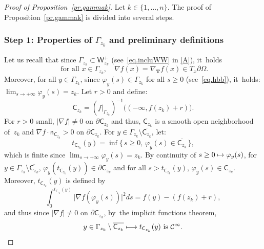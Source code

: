\documentclass[10pt]{amsart}
\newcommand\mto{\mathchoice{\longmapsto}{\mapsto}{\mapsto}{\mapsto}}
\newcommand{\mbf}[1]{\mathbf{#1}}
\let\pa\partial
\theoremstyle{plain}
\theoremstyle{definition}
\begin{document}
\label{sec:gammak}

\begin{proof}[Proof of Proposition~\ref{pr.gammak}]
Let $k\in \{1,\ldots,n\}$.
The proof of Proposition~\ref{pr.gammak} is divided into several steps.

\subsubsection*{Step 1: Properties of $\Gamma_{z_k}$ and preliminary definitions}
Let us recall that since $\Gamma_{z_k}\subset \mathsf W_{z_k}^+$ (see~\eqref{eq.incluWW} in \ref{A}), it~holds
\[
\text{ for all } x\in \Gamma_{z_k}, \quad \nabla f(x)=\nabla_{\mbf T}f(x) \in T_x\partial \Omega.
\]
Moreover, for all $y\in \Gamma_{z_k}$, since $\varphi_y(s)\in \Gamma_{z_k}$ for all $s\ge 0$ (see~\eqref{eq.hbb}), it~holds: $\lim_{s\to +\infty}\varphi_y(s)=z_k$.
Let $r>0$ and define:
\[
\mathsf C_{z_k} =(f|_{\Gamma_{z_k}})^{-1}\bigl((-\infty, f(z_k)+r)\bigr).
\]
For $r>0$ small, $\vert \nabla f\vert \neq 0$ on $\pa \mathsf C_{z_k}$ and thus, ${\mathsf C_{z_k}}$ is a smooth open neighborhood of~$z_k$ and $\nabla f \cdot \mathsf n_{\mathsf C_{z_k}}>0$ on $\pa \mathsf C_{z_k}$. For $y\in \Gamma_{z_k}\setminus \overline{ \mathsf C_{z_k} }$, let:
\begin{equation}\label{eq.sinf}
t_{\mathsf C_{z_k}}(y)=\inf\{\, s\ge 0, \, \varphi_{y}(s)\in \overline{\mathsf C_{z_k}}\, \},
\end{equation}
which is finite since $\lim_{s\to +\infty}\varphi_y(s)=z_k$.
By continuity of $s\ge 0\mto \varphi_y(s)$, for $y\in \Gamma_{z_k}\setminus \overline{ \mathsf C_{z_k} }$, $\varphi_y(t_{\mathsf C_{z_k}}(y))\in \pa \mathsf C_{z_k}$ and for all $s> t_{\mathsf C_{z_k}}(y)$, $\varphi_y(s)\in \mathsf C_{z_k}$. Moreover, $t_{\mathsf C_{z_k}}(y)$ is defined by
\[
\int_0^{t_{\mathsf C_{z_k}}(y)} \vert \nabla f(\varphi_y(s))\vert^2ds= f(y)-(f(z_k)+r),
\]
and thus since $\vert \nabla f\vert \neq 0$ on $\pa \mathsf C_{z_k}$, by~the implicit functions theorem,
\begin{equation}\label{eq.sinfregularite}
y\in \Gamma_{z_k} \setminus \overline{ \mathsf C_{z_k} } \mto t_{\mathsf C_{z_k}}(y) \text{ is } \mathcal C^\infty.
\end{equation}


\end{proof}
\end{document}
